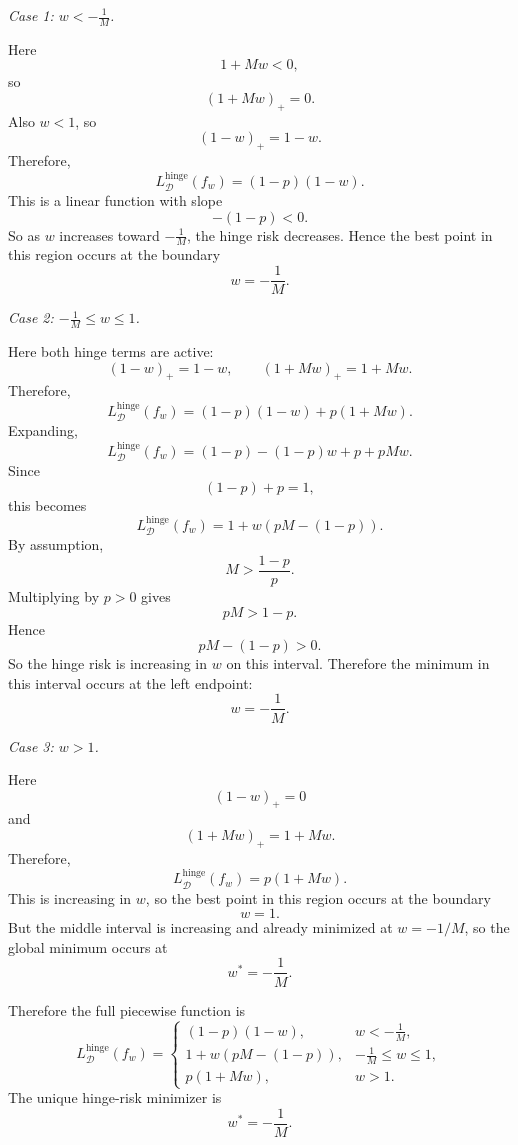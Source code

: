 \documentclass[11pt]{article}
\begin{document}
\begin{enumerate}
\begin{solutionbox}
    \medskip

    \textit{Case 1: $w<-\frac1M$.}

    Here
    \[
    1+Mw<0,
    \]
    so
    \[
    (1+Mw)_+=0.
    \]
    Also $w<1$, so
    \[
    (1-w)_+=1-w.
    \]
    Therefore,
    \[
    L_{\mathcal D}^{\mathrm{hinge}}(f_w)
    =
    (1-p)(1-w).
    \]
    This is a linear function with slope
    \[
    -(1-p)<0.
    \]
    So as $w$ increases toward $-\frac1M$, the hinge risk decreases. Hence the best point in
    this region occurs at the boundary
    \[
    w=-\frac1M.
    \]

    \medskip

    \textit{Case 2: $-\frac1M\le w\le1$.}

    Here both hinge terms are active:
    \[
    (1-w)_+=1-w,
    \qquad
    (1+Mw)_+=1+Mw.
    \]
    Therefore,
    \[
    L_{\mathcal D}^{\mathrm{hinge}}(f_w)
    =
    (1-p)(1-w)+p(1+Mw).
    \]
    Expanding,
    \[
    L_{\mathcal D}^{\mathrm{hinge}}(f_w)
    =
    (1-p)-(1-p)w+p+pMw.
    \]
    Since
    \[
    (1-p)+p=1,
    \]
    this becomes
    \[
    L_{\mathcal D}^{\mathrm{hinge}}(f_w)
    =
    1+w(pM-(1-p)).
    \]
    By assumption,
    \[
    M>\frac{1-p}{p}.
    \]
    Multiplying by $p>0$ gives
    \[
    pM>1-p.
    \]
    Hence
    \[
    pM-(1-p)>0.
    \]
    So the hinge risk is increasing in $w$ on this interval. Therefore the minimum in this
    interval occurs at the left endpoint:
    \[
    w=-\frac1M.
    \]

    \medskip

    \textit{Case 3: $w>1$.}

    Here
    \[
    (1-w)_+=0
    \]
    and
    \[
    (1+Mw)_+=1+Mw.
    \]
    Therefore,
    \[
    L_{\mathcal D}^{\mathrm{hinge}}(f_w)
    =
    p(1+Mw).
    \]
    This is increasing in $w$, so the best point in this region occurs at the boundary
    \[
    w=1.
    \]
    But the middle interval is increasing and already minimized at $w=-1/M$, so the global
    minimum occurs at
    \[
    \boxed{
    w^\ast=-\frac1M.
    }
    \]

    Therefore the full piecewise function is
    \[
    L_{\mathcal D}^{\mathrm{hinge}}(f_w)
    =
    \begin{cases}
    (1-p)(1-w), & w<-\frac1M,\\[4pt]
    1+w(pM-(1-p)), & -\frac1M\le w\le1,\\[4pt]
    p(1+Mw), & w>1.
    \end{cases}
    \]
    The unique hinge-risk minimizer is
    \[
    \boxed{
    w^\ast=-\frac1M.
    }
    \]


\end{solutionbox}
\end{enumerate}
\end{document}
